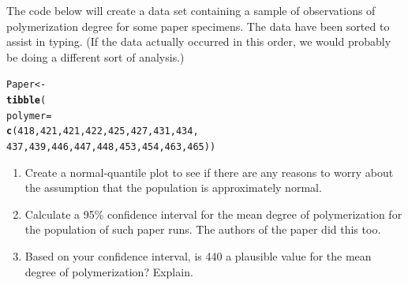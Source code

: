 \documentclass[twoside]{book}\usepackage[]{graphicx}\usepackage[]{xcolor}
\makeatletter
\newcommand{\hlnum}[1]{\textcolor[rgb]{0.686,0.059,0.569}{#1}}%
\newcommand{\hlstd}[1]{\textcolor[rgb]{0.345,0.345,0.345}{#1}}%
\newcommand{\hlkwb}[1]{\textcolor[rgb]{0.69,0.353,0.396}{#1}}%
\newcommand{\hlkwc}[1]{\textcolor[rgb]{0.333,0.667,0.333}{#1}}%
\newcommand{\hlkwd}[1]{\textcolor[rgb]{0.737,0.353,0.396}{\textbf{#1}}}%
\newenvironment{kframe}{%
 \def\at@end@of@kframe{}%
 \ifinner\ifhmode%
  \def\at@end@of@kframe{\end{minipage}}%
  \begin{minipage}{\columnwidth}%
 \fi\fi%
 \def\FrameCommand##1{\hskip\@totalleftmargin \hskip-\fboxsep
 \colorbox{shadecolor}{##1}\hskip-\fboxsep
     \hskip-\linewidth \hskip-\@totalleftmargin \hskip\columnwidth}%
 \MakeFramed {\advance\hsize-\width
   \@totalleftmargin\z@ \linewidth\hsize
   \@setminipage}}%
 {\par\unskip\endMakeFramed%
 \at@end@of@kframe}
\newenvironment{knitrout}{}{} %
\makeatother
\begin{document}
\begin{problem}
	The code below will create a data set containing a sample of observations
	of polymerization degree for some paper specimens.  The data have been 
	sorted to assist in typing.  (If the data actually occurred in this order,
	we would probably be doing a different sort of analysis.)
\begin{knitrout}
\color{fgcolor}\begin{kframe}
\begin{alltt}
\hlstd{Paper} \hlkwb{<-}
        \hlkwd{tibble}\hlstd{(}
          \hlkwc{polymer} \hlstd{=}
            \hlkwd{c}\hlstd{(}\hlnum{418}\hlstd{,} \hlnum{421}\hlstd{,} \hlnum{421}\hlstd{,} \hlnum{422}\hlstd{,} \hlnum{425}\hlstd{,} \hlnum{427}\hlstd{,} \hlnum{431}\hlstd{,} \hlnum{434}\hlstd{,}
        \hlnum{437}\hlstd{,} \hlnum{439}\hlstd{,} \hlnum{446}\hlstd{,} \hlnum{447}\hlstd{,} \hlnum{448}\hlstd{,} \hlnum{453}\hlstd{,} \hlnum{454}\hlstd{,} \hlnum{463}\hlstd{,} \hlnum{465}\hlstd{))}
\end{alltt}
\end{kframe}
\end{knitrout}
	\begin{enumerate}
		\item Create a normal-quantile plot to see if there are any reasons
			to worry about the assumption that the population is approximately normal.
		\item
				Calculate 
				a 95\% confidence interval for the mean
				degree of polymerization for the population of such paper runs.
				The authors of the paper did this too.
		\item
			Based on your confidence interval, is 440 a plausible value
			for the mean degree of polymerization?  Explain.
	\end{enumerate}
\end{problem}
\end{document}
